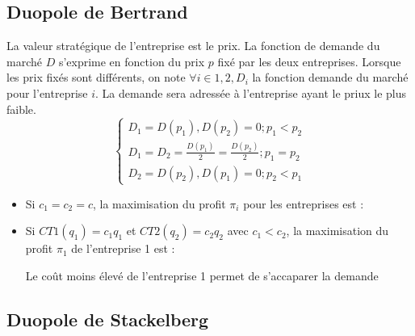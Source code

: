 \subsection{Duopole de Bertrand}
La valeur stratégique de l'entreprise est le prix. La fonction de demande du marché $D$ s'exprime en fonction du prix $p$ fixé par les deux entreprises.
Lorsque les prix fixés sont différents, on note $\forall i \in {1,2}, D_{i}$ la fonction demande du marché pour l'entreprise $i$. La demande sera adressée à l'entreprise ayant le priux le plus faible.
\[
\left \{
\begin{array}{c}
    D_{1} = D(p_{1}), D(p_{2}) = 0 ;p_{1} < p_{2}\\
    D_{1} = D_{2} = \frac{D(p_{1})}{2} =  \frac{D(p_{2})}{2} ;p_{1} = p_{2}\\
    D_{2} = D(p_{2}), D(p_{1}) = 0 ;p_{2} < p_{1}
\end{array}
\right.
\]
\begin{itemize}
    \item Si $c_{1} = c_{2} = c$, la maximisation du profit $\pi_{i}$ pour les entreprises est :
    \begin{center}
        \Large{}
    \end{center}
    \item Si $CT{1}(q_{1}) = c_{1}q_{1}$ et $CT{2}(q_{2}) = c_{2}q_{2}$ avec $c_{1} < c_{2}$, la maximisation du profit $\pi_{1}$ de l'entreprise 1 est :
    \begin{center}
        \Large{}
    \end{center}
    Le coût moins élevé de l'entreprise 1 permet de s'accaparer la demande
\end{itemize}
\newpage
\subsection{Duopole de Stackelberg}

